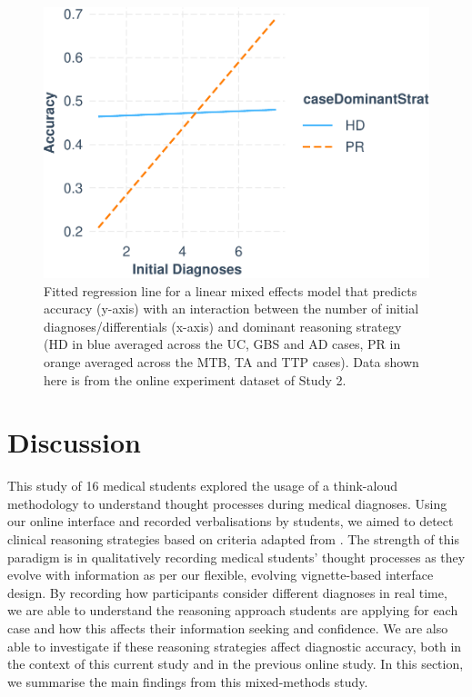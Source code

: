 \documentclass[a4paper, nobind]{templates/ociamthesis}
\begin{document}
\hfill\break

\begin{figure}[H]
\includegraphics{_main_files/figure-latex/accmodelplot-1} \caption[Think-Aloud Study: Initial Differentials and Reasoning Strategy against Accuracy (Regression)]{Fitted regression line for a linear mixed effects model that predicts accuracy (y-axis) with an interaction between the number of initial diagnoses/differentials (x-axis) and dominant reasoning strategy (HD in blue averaged across the UC, GBS and AD cases, PR in orange averaged across the MTB, TA and TTP cases). Data shown here is from the online experiment dataset of Study 2.}\label{fig:accmodelplot}
\end{figure}

\section{Discussion}\label{discussion-2}

This study of 16 medical students explored the usage of a think-aloud methodology to understand thought processes during medical diagnoses. Using our online interface and recorded verbalisations by students, we aimed to detect clinical reasoning strategies based on criteria adapted from \textcite{coderre_diagnostic_2003}. The strength of this paradigm is in qualitatively recording medical students' thought processes as they evolve with information as per our flexible, evolving vignette-based interface design. By recording how participants consider different diagnoses in real time, we are able to understand the reasoning approach students are applying for each case and how this affects their information seeking and confidence. We are also able to investigate if these reasoning strategies affect diagnostic accuracy, both in the context of this current study and in the previous online study. In this section, we summarise the main findings from this mixed-methods study.
\end{document}
